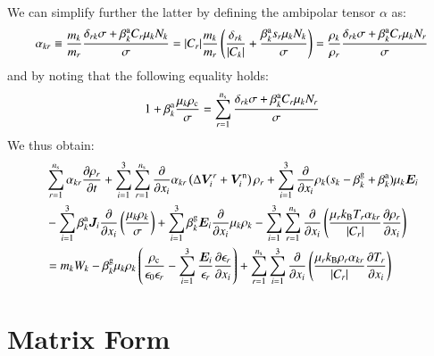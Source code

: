 \documentclass{warpdoc}
\newcommand{\ns}{{n_{\rm s}}}
\renewcommand{\vec}[1]{\bm{#1}}
\begin{document}
We can simplify further the latter by defining the ambipolar tensor $\alpha$ as:
%
\begin{equation}
\alpha_{kr} \equiv
  \frac{m_k}{m_r}\frac{\delta_{rk}\sigma+ \beta_k^{\rm a} C_r  \mu_k N_k}{\sigma} 
=  |C_r| \frac{m_k}{m_r}\left( \frac{\delta_{rk}}{|C_k|}+  \frac{ \beta_k^{\rm a} s_r \mu_k N_k}{\sigma}\right)
=  \frac{\rho_k}{\rho_r}\frac{\delta_{rk}\sigma+ \beta_k^{\rm a} C_r  \mu_k N_r}{\sigma} 
\end{equation}
%
and by noting that the following equality holds:
%
\begin{equation}
1+\beta_k^{\rm a} \frac{\mu_k\rho_{\rm c}}{\sigma} 
= \sum_{r=1}^\ns \frac{\delta_{rk}\sigma+ \beta_k^{\rm a} C_r  \mu_k N_r}{\sigma} 
 \end{equation}
%
We thus obtain:
%
\begin{align}
  &  \sum_{r=1}^{\ns} \alpha_{kr} \frac{\partial \rho_r}{\partial t}  
+ \sum_{i=1}^3 \sum_{r=1}^\ns  \frac{\partial}{\partial x_i}      \alpha_{kr} \left( \Delta \vec{V}_i^r + \vec{V}^{\rm n}_i \right)\rho_r  
  + \sum_{i=1}^3 \frac{\partial}{\partial x_i}  \rho_k  (s_k-\beta_k^{\rm g}+ \beta^{\rm a}_k) \mu_k  \vec{E}_i   
\nonumber \\
&- \sum_{i=1}^3 \beta_k^{\rm a}\vec{J}_i \frac{\partial}{\partial x_i}  \left( \frac{\mu_k \rho_k}{\sigma} 
\right) 
+ \sum_{i=1}^3 \beta_k^{\rm g} \vec{E}_i \frac{\partial }{\partial x_i} \mu_{k} \rho_{k}
- \sum_{i=1}^3 \sum_{r=1}^{\ns} \frac{\partial}{\partial x_i} \left(\frac{\mu_r k_{\rm B} T_r \alpha_{kr}}{|C_r|}  \frac{\partial \rho_r}{\partial x_i}\right) 
\nonumber \\
&= m_k W_k
-\beta_k^{\rm g} \mu_{k} \rho_{k}\left(
  \frac{\rho_{\rm c}}{\epsilon_0\epsilon_r}
  -\sum_{i=1}^3 \frac{\vec{E}_i}{\epsilon_r} \frac{\partial \epsilon_r}{\partial x_i}  
\right)
+ \sum_{r=1}^\ns \sum_{i=1}^3  \frac{\partial}{\partial x_i} \left( \frac{\mu_r k_{\rm B} \rho_r  \alpha_{kr}}{|C_r|}   \frac{\partial T_r}{\partial x_i} \right)
\end{align}
%

\section{Matrix Form}
\end{document}
